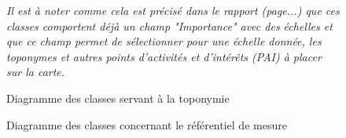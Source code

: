 \documentclass{themeensg}
\begin{document}
\begin{appendices}
\addtocounter{figure}{-1}
\begin{figure}
\addtocounter{figure}{1}
\centering
{}%
\caption{Diagramme des classes servant à la toponymie}%
\textit{Il est à noter comme cela est précisé dans le rapport (page...) que ces classes comportent déjà un champ "Importance" avec des échelles et que ce champ permet de sélectionner pour une échelle donnée, les toponymes et autres points d'activités et d'intérêts (PAI) à placer sur la carte.}
\end{figure}

\addtocounter{figure}{-1}
\begin{figure}
\addtocounter{figure}{1}
\centering
{}%
\caption{Diagramme des classes concernant le référentiel de mesure}%
\end{figure}


\end{appendices}
\end{document}
